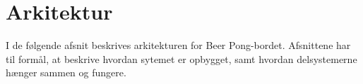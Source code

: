 \documentclass[Rapport/Rapport_main.tex]{subfiles}
\begin{document}
\section{Arkitektur}
I de følgende afsnit beskrives arkitekturen for Beer Pong-bordet. Afsnittene har til formål, at beskrive hvordan sytemet er opbygget, samt hvordan delsystemerne hænger sammen og fungere.


\newpage

\newpage

\newpage

\newpage

\end{document}
